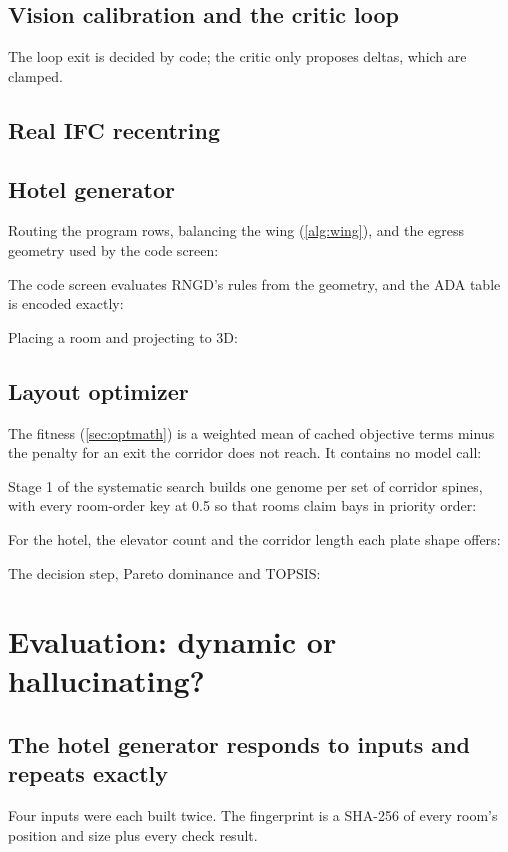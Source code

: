 \documentclass[10pt,a4paper]{article}
\theoremstyle{definition}
\begin{document}
\subsection{Vision calibration and the critic loop}

The loop exit is decided by code; the critic only proposes deltas, which are clamped.



\subsection{Real IFC recentring}


\subsection{Hotel generator}
Routing the program rows, balancing the wing (\cref{alg:wing}), and the egress geometry used by the code screen:



The code screen evaluates RNGD's rules from the geometry, and the ADA table is encoded exactly:


Placing a room and projecting to 3D:


\subsection{Layout optimizer}
The fitness (\cref{sec:optmath}) is a weighted mean of cached objective terms minus the penalty for an exit the
corridor does not reach. It contains no model call:

Stage 1 of the systematic search builds one genome per set of corridor spines, with every room-order key at 0.5 so
that rooms claim bays in priority order:

For the hotel, the elevator count and the corridor length each plate shape offers:

The decision step, Pareto dominance and TOPSIS:


\section{Evaluation: dynamic or hallucinating?}
\label{sec:eval}

\subsection{The hotel generator responds to inputs and repeats exactly}
Four inputs were each built twice. The fingerprint is a SHA-256 of every room's position and size plus every check
result.
\end{document}
